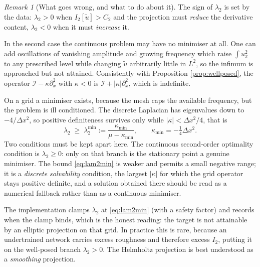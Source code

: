 \documentclass[11pt,a4paper]{article}
\theoremstyle{remark}
\newtheorem{remark}{Remark}
\newcommand{\ut}{\tilde{u}}
\begin{document}
\begin{remark}[What goes wrong, and what to do about it]
\label{rem:lam2neg}
The sign of $\lambda_2$ is set by the data: $\lambda_2 > 0$ when
$I_2[\ut] > C_2$ and the projection must \emph{reduce} the derivative content,
$\lambda_2 < 0$ when it must \emph{increase} it.

In the second case the continuous problem may have no minimiser at all. One can
add oscillations of vanishing amplitude and growing frequency which raise
$\int u_x^2$ to any prescribed level while changing $\ut$ arbitrarily little in
$L^2$, so the infimum is approached but not attained. Consistently with
Proposition \ref{prop:wellposed}, the operator
$\mathcal{I}-\kappa\partial_x^2$ with $\kappa<0$ is
$\mathcal{I}+|\kappa|\partial_x^2$, which is indefinite.

On a grid a minimiser exists, because the mesh caps the available frequency,
but the problem is ill conditioned. The discrete Laplacian has eigenvalues down
to $-4/\Delta x^2$, so positive definiteness survives only while
$|\kappa| < \Delta x^2/4$, that is
\begin{equation}
\lambda_2 \;\geq\; \lambda_2^{\min}
:= \frac{\kappa_{\min}}{\mu - \kappa_{\min}},
\qquad \kappa_{\min} = -\tfrac{1}{4}\Delta x^2 .
\label{eq:lam2min}
\end{equation}
Two conditions must be kept apart here. The continuous second-order optimality
condition is $\lambda_2 \geq 0$: only on that branch is the stationary point a
genuine minimiser. The bound \eqref{eq:lam2min} is weaker and permits a small
negative range; it is a \emph{discrete solvability} condition, the largest
$|\kappa|$ for which the grid operator stays positive definite, and a solution
obtained there should be read as a numerical fallback rather than as a
continuous minimiser.

The implementation clamps $\lambda_2$ at \eqref{eq:lam2min} (with a safety
factor) and records when the clamp binds, which is the honest reading: the
target is not attainable by an elliptic projection on that grid. In practice
this is rare, because an undertrained network carries excess roughness and
therefore excess $I_2$, putting it on the well-posed branch $\lambda_2 > 0$.
The Helmholtz projection is best understood as a \emph{smoothing} projection.


\end{remark}
\end{document}
